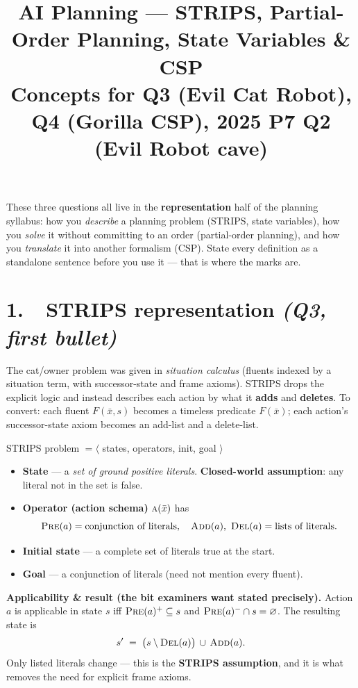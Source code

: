 \documentclass[11pt,a4paper]{article}
\title{\vspace{-1.5cm}AI Planning --- STRIPS, Partial-Order Planning, State Variables \& CSP\\[2pt]
\large Concepts for Q3 (Evil Cat Robot), Q4 (Gorilla CSP), 2025 P7 Q2 (Evil Robot cave)}
\author{}
\date{}
\newcommand{\pred}[1]{\textsc{#1}}
\newcommand{\add}{\textsc{Add}}
\newcommand{\del}{\textsc{Del}}
\newcommand{\pre}{\textsc{Pre}}
\begin{document}
\maketitle
\vspace{-1cm}

These three questions all live in the \textbf{representation} half of the planning syllabus: how you \emph{describe} a planning problem (STRIPS, state variables), how you \emph{solve} it without committing to an order (partial-order planning), and how you \emph{translate} it into another formalism (CSP). State every definition as a standalone sentence before you use it --- that is where the marks are.

\section*{1.\ \ STRIPS representation \hfill {\normalfont\itshape (Q3, first bullet)}}

The cat/owner problem was given in \emph{situation calculus} (fluents indexed by a situation term, with successor-state and frame axioms). STRIPS drops the explicit logic and instead describes each action by what it \textbf{adds} and \textbf{deletes}. To convert: each fluent $F(\bar x, s)$ becomes a timeless predicate $F(\bar x)$; each action's successor-state axiom becomes an add-list and a delete-list.

\begin{defbox}{STRIPS problem $= \langle$ states, operators, init, goal $\rangle$}
\begin{itemize}[leftmargin=*,itemsep=1pt]
  \item \textbf{State} --- a \emph{set of ground positive literals}. \textbf{Closed-world assumption}: any literal not in the set is false.
  \item \textbf{Operator (action schema)} $\pred{a}(\bar x)$ has
        \[ \pre(a)=\text{conjunction of literals},\quad \add(a),\ \del(a)=\text{lists of literals}. \]
  \item \textbf{Initial state} --- a complete set of literals true at the start.
  \item \textbf{Goal} --- a conjunction of literals (need not mention every fluent).
\end{itemize}
\end{defbox}

\textbf{Applicability \& result (the bit examiners want stated precisely).} Action $a$ is applicable in state $s$ iff $\pre(a)^{+}\subseteq s$ and $\pre(a)^{-}\cap s=\varnothing$. The resulting state is
\[
  s' \;=\; \bigl(s \setminus \del(a)\bigr)\,\cup\,\add(a).
\]
Only listed literals change --- this is the \textbf{STRIPS assumption}, and it is what removes the need for explicit frame axioms.
\end{document}
